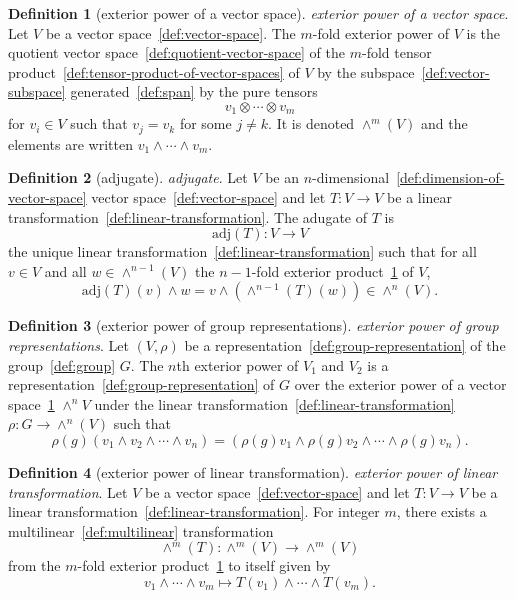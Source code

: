 \documentclass[12pt,a4paper]{article}
\theoremstyle{definition}
\newtheorem{definition}{Definition}
\begin{document}
\begin{definition}[exterior power of a vector space]\label{def:exterior-power-of-a-vector-space}
\emph{exterior power of a vector space}. Let $V$ be a vector space~\ref{def:vector-space}. The $m$-fold exterior power of $V$ is the quotient vector space~\ref{def:quotient-vector-space} of the $m$-fold tensor product~\ref{def:tensor-product-of-vector-spaces} of $V$ by the subspace~\ref{def:vector-subspace} generated~\ref{def:span} by the pure tensors $$v_1\otimes\cdots\otimes v_m$$ for $v_i \in V$ such that $v_j = v_k$ for some $j\neq k$. It is denoted $\wedge^m(V)$ and the elements are written $v_1\wedge\cdots\wedge v_m$.
\end{definition}

\begin{definition}[adjugate]\label{def:adjugate}
\emph{adjugate}. Let $V$ be an $n$-dimensional~\ref{def:dimension-of-vector-space} vector space~\ref{def:vector-space} and let $T:V\to V$ be a linear transformation~\ref{def:linear-transformation}. The adugate of $T$ is $$\text{adj}(T):V\to V$$ the unique linear transformation~\ref{def:linear-transformation} such that for all $v \in V$ and all $w \in \wedge^{n-1}(V)$ the $n-1$-fold exterior product~\ref{def:exterior-power-of-a-vector-space} of $V$, $$\text{adj}(T)(v) \wedge w = v \wedge (\wedge^{n-1}(T)(w)) \in \wedge^n(V).$$
\end{definition}

\begin{definition}[exterior power of group representations]\label{def:exterior-power-of-group-representations}
\emph{exterior power of group representations}. Let $(V,\rho)$ be a representation~\ref{def:group-representation} of the group~\ref{def:group} $G$. The $n$th exterior power of $V_1$ and $V_2$ is a representation~\ref{def:group-representation} of $G$ over the exterior power of a vector space~\ref{def:exterior-power-of-a-vector-space} $\wedge^nV$ under the linear transformation~\ref{def:linear-transformation} $\rho:G\to \wedge^n(V)$ such that $$\rho(g)(v_1\wedge v_2\wedge \cdots \wedge v_n) = (\rho(g)v_1\wedge \rho(g)v_2\wedge\cdots\wedge\rho(g)v_n).$$
\end{definition}

\begin{definition}[exterior power of linear transformation]\label{def:exterior-power-of-linear-transformation}
\emph{exterior power of linear transformation}. Let $V$ be a vector space~\ref{def:vector-space} and let $T:V\to V$ be a linear transformation~\ref{def:linear-transformation}. For integer $m$, there exists a multilinear~\ref{def:multilinear} transformation $$\wedge^m(T): \wedge^m(V) \to \wedge^m(V)$$ from the $m$-fold exterior product~\ref{def:exterior-power-of-a-vector-space} to itself given by $$v_1\wedge\cdots\wedge v_m \mapsto T(v_1)\wedge\cdots\wedge T(v_m).$$
\end{definition}
\end{document}
